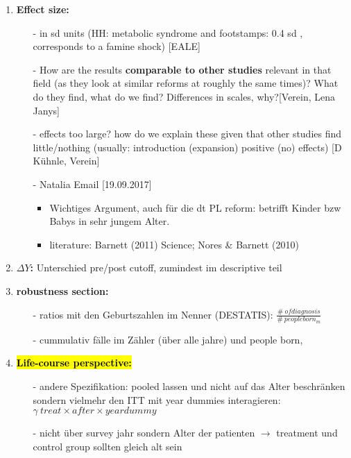 \documentclass[11pt,a4paper]{article}
\begin{document}
\begin{enumerate}
\item \textbf{Effect size:}\vspace{-1em}
\begin{itemize}
\item[-]in sd units (HH: metabolic syndrome and footstamps: 0.4 sd , corresponds to a famine shock) [EALE]
\item[-] How are the results \textbf{comparable to other studies} relevant in that field (as they look at similar reforms at roughly the same times)? What do they find, what do we find? Differences in scales, why?[Verein, Lena Janys]
\item[-] effects too large? how do we explain these given that other studies find little/nothing (usually: introduction (expansion) positive (no) effects) [D Kühnle, Verein]
\item[-] Natalia Email [19.09.2017]\vspace{-0.5em}
\begin{itemize}
\item Wichtiges Argument, auch für die dt PL reform: betrifft Kinder bzw Babys in sehr jungem Alter.
\item literature: Barnett (2011) Science; Nores \& Barnett (2010) 
\end{itemize}


\end{itemize}


\item \textbf{$\Delta Y$:}\newline
Unterschied pre/post cutoff, zumindest im descriptive teil


\item \textbf{robustness section:}\vspace{-1em}
\begin{itemize}
\item[-] ratios mit den Geburtszahlen im Nenner (DESTATIS): $\frac{\#\ of diagnosis}{\#\ people born_m}$
\item[-] cummulativ fälle im Zähler (über alle jahre) und people born, 
\end{itemize}


\item \textbf{\hl{Life-course perspective:}}\vspace{-1em}
\begin{itemize}
\item[-]andere Spezifikation: pooled lassen und nicht auf das Alter beschränken sondern vielmehr den ITT mit year dummies interagieren: \newline
$\gamma\  treat \times after \times yeardummy$
\item[-] nicht über survey jahr sondern Alter der patienten $\rightarrow$ treatment und control group sollten gleich alt sein
\end{itemize}



\end{enumerate}
\end{document}
